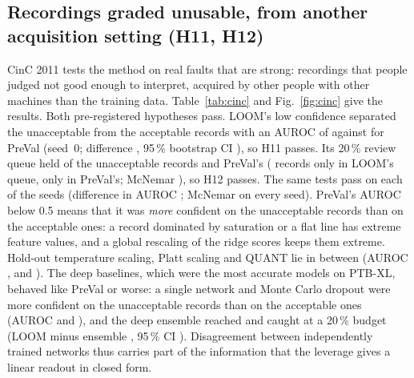 \documentclass[preprint,12pt,authoryear]{elsarticle}
\begin{document}
\subsection{Recordings graded unusable, from another acquisition setting (H11, H12)}\label{sec:cinc}
CinC 2011 tests the method on real faults that are strong: recordings that people judged not good enough to interpret, acquired by other people with other machines than the training data. Table~\ref{tab:cinc} and Fig.~\ref{fig:cinc} give the results. Both pre-registered hypotheses pass. LOOM's low confidence separated the unacceptable from the acceptable records with an AUROC of \CincHElevenLoom{} against \CincHElevenPreVal{} for PreVal (seed~0; difference \CincHElevenDiff, 95\,\% bootstrap CI \CincHElevenCI), so H11 passes. Its 20\,\% review queue held \CincHTwelveCaughtLoom{} of the \CincUnacc{} unacceptable records and PreVal's \CincHTwelveCaughtPreVal{} (\CincHTwelveLoomOnly{} records only in LOOM's queue, \CincHTwelvePreValOnly{} only in PreVal's; McNemar \CincHTwelveP), so H12 passes. The same tests pass on each of the \CincNSeeds{} seeds (difference in AUROC \CincHElevenDiffRange; McNemar \CincHTwelvePMax{} on every seed). PreVal's AUROC below 0.5 means that it was \emph{more} confident on the unacceptable records than on the acceptable ones: a record dominated by saturation or a flat line has extreme feature values, and a global rescaling of the ridge scores keeps them extreme. Hold-out temperature scaling, Platt scaling and QUANT lie in between (AUROC \CincDetHoldoutTS, \CincDetPlatt{} and \CincDetQuant). The deep baselines, which were the most accurate models on PTB-XL, behaved like PreVal or worse: a single network and Monte Carlo dropout were more confident on the unacceptable records than on the acceptable ones (AUROC \CincDetDeepSingle{} and \CincDetMCDrop), and the deep ensemble reached \CincDetDeepEns{} and caught \CincCaughtDeepEns{} at a 20\,\% budget (LOOM minus ensemble \CincLoomMinusDeepEns, 95\,\% CI \CincLoomMinusDeepEnsCI). Disagreement between independently trained networks thus carries part of the information that the leverage gives a linear readout in closed form.
\end{document}
